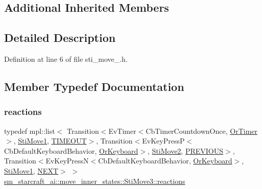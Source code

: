 \subsection*{Additional Inherited Members}


\subsection{Detailed Description}


Definition at line 6 of file sti\+\_\+move\+\_.\+h.



\subsection{Member Typedef Documentation}
\mbox{\label{structsm__starcraft__ai_1_1move__inner__states_1_1StiMove3_a80a8cb4c25b8e2a44e50da48373cb72c}} 
\subsubsection{\texorpdfstring{reactions}{reactions}}
{\footnotesize\ttfamily typedef mpl\+::list$<$ Transition$<$Ev\+Timer$<$Cb\+Timer\+Countdown\+Once, \hyperlink{classsm__starcraft__ai_1_1OrTimer}{Or\+Timer}$>$, \hyperlink{structsm__starcraft__ai_1_1move__inner__states_1_1StiMove1}{Sti\+Move1}, \hyperlink{structsm__starcraft__ai_1_1move__inner__states_1_1StiMove3_1_1TIMEOUT}{T\+I\+M\+E\+O\+UT}$>$, Transition$<$Ev\+Key\+PressP$<$Cb\+Default\+Keyboard\+Behavior, \hyperlink{classsm__starcraft__ai_1_1OrKeyboard}{Or\+Keyboard}$>$, \hyperlink{structsm__starcraft__ai_1_1move__inner__states_1_1StiMove2}{Sti\+Move2}, \hyperlink{structsm__starcraft__ai_1_1move__inner__states_1_1StiMove3_1_1PREVIOUS}{P\+R\+E\+V\+I\+O\+US}$>$, Transition$<$Ev\+Key\+PressN$<$Cb\+Default\+Keyboard\+Behavior, \hyperlink{classsm__starcraft__ai_1_1OrKeyboard}{Or\+Keyboard}$>$, \hyperlink{structsm__starcraft__ai_1_1move__inner__states_1_1StiMove1}{Sti\+Move1}, \hyperlink{structsm__starcraft__ai_1_1move__inner__states_1_1StiMove3_1_1NEXT}{N\+E\+XT}$>$ $>$ \hyperlink{structsm__starcraft__ai_1_1move__inner__states_1_1StiMove3_a80a8cb4c25b8e2a44e50da48373cb72c}{sm\+\_\+starcraft\+\_\+ai\+::move\+\_\+inner\+\_\+states\+::\+Sti\+Move3\+::reactions}}



